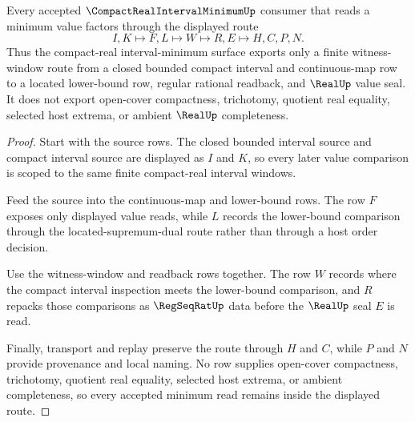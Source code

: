 \begin{theorem}
\label{thm:compact-real-interval-minimum-located-attainment}
Every accepted $\CompactRealIntervalMinimumUp$ consumer that reads a minimum value factors through the displayed route
$$
I,K \longmapsto F,L \longmapsto W \longmapsto R,E \longmapsto H,C,P,N .
$$
Thus the compact-real interval-minimum surface exports only a finite witness-window route from a closed bounded compact interval and continuous-map row to a located lower-bound row, regular rational readback, and $\RealUp$ value seal. It does not export open-cover compactness, trichotomy, quotient real equality, selected host extrema, or ambient $\RealUp$ completeness.
\end{theorem}
\begin{proof}
Start with the source rows. The closed bounded interval source and compact interval source are displayed as $I$ and $K$, so every later value comparison is scoped to the same finite compact-real interval windows.

Feed the source into the continuous-map and lower-bound rows. The row $F$ exposes only displayed value reads, while $L$ records the lower-bound comparison through the located-supremum-dual route rather than through a host order decision.

Use the witness-window and readback rows together. The row $W$ records where the compact interval inspection meets the lower-bound comparison, and $R$ repacks those comparisons as $\RegSeqRatUp$ data before the $\RealUp$ seal $E$ is read.

Finally, transport and replay preserve the route through $H$ and $C$, while $P$ and $N$ provide provenance and local naming. No row supplies open-cover compactness, trichotomy, quotient real equality, selected host extrema, or ambient completeness, so every accepted minimum read remains inside the displayed route.
\end{proof}



